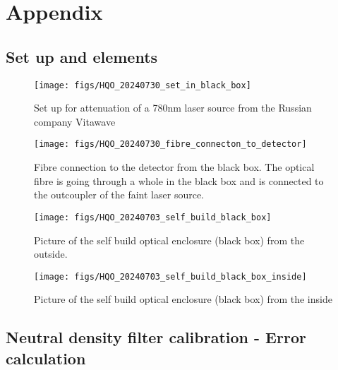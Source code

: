 \chapter{Appendix}
\label{sec:app}

\section{Set up and elements}\label{sec:Set_up_and_Elements_appendix}

\begin{figure}
    \centering
    \texttt{[image: figs/HQO\_20240730\_set\_in\_black\_box]}
    \caption{Set up for attenuation of a 780nm laser source from the Russian company Vitawave}
    \label{fig: faint_laser_source_full_set_up_real_life}
\end{figure}

\begin{figure}
    \centering
    \texttt{[image: figs/HQO\_20240730\_fibre\_connecton\_to\_detector]}
    \caption{Fibre connection to the detector from the black box. The optical fibre is going through a whole in the black box and is connected to the
    outcoupler of the faint laser source.}
    \label{fig: fibre_connection_real_life}
\end{figure}

\begin{figure}
    \centering
    \texttt{[image: figs/HQO\_20240703\_self\_build\_black\_box]}
    \caption{Picture of the self build optical enclosure (black box) from the outside.}
    \label{fig: black_box_outside}
\end{figure}

\begin{figure}
    \centering
    \texttt{[image: figs/HQO\_20240703\_self\_build\_black\_box\_inside]}
    \caption{Picture of the self build optical enclosure (black box) from the inside}
    \label{fig:black_box_inside}
\end{figure}

\FloatBarrier

\section{Neutral density filter calibration - Error calculation}\label{sec:ND_filter_calibration_appendix}

